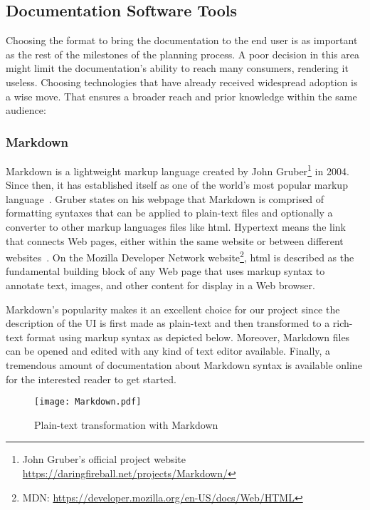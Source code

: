 \subsection{Documentation Software Tools}

Choosing the format to bring the documentation to the end user is as important as the rest of the milestones of the planning process. A poor decision in this area might limit the documentation's ability to reach many consumers, rendering it useless. Choosing technologies that have already received widespread adoption is a wise move. That ensures a broader reach and prior knowledge within the same audience:

\subsubsection{Markdown}\label{sec:MD}

Markdown is a lightweight markup language created by John Gruber\footnote{John Gruber's official project website \url{https://daringfireball.net/projects/Markdown/}} in 2004. Since then, it has established itself as one of the world's most popular markup language~\cite{Markdown}. Gruber states on his webpage that Markdown is comprised of formatting syntaxes that can be applied to plain-text files and optionally a converter to other markup languages files like \gls{html}. Hypertext means the link that connects Web pages, either within the same website or between different websites~\cite{mozillaMDN}. On the Mozilla Developer Network website\footnote{MDN: \url{https://developer.mozilla.org/en-US/docs/Web/HTML}}, \gls*{html} is described as the fundamental building block of any Web page that uses markup syntax to annotate text, images, and other content for display in a Web browser.

Markdown's popularity makes it an excellent choice for our project since the description of the UI is first made as plain-text and then transformed to a rich-text format using markup syntax as depicted below. Moreover, Markdown files can be opened and edited with any kind of text editor available. Finally, a tremendous amount of documentation about Markdown syntax is available online for the interested reader to get started.

\begin{figure}[h]
    \centering
    \texttt{[image: Markdown.pdf]}
    \caption{Plain-text transformation with Markdown}
    \label{fig:Markdown}
\end{figure}

